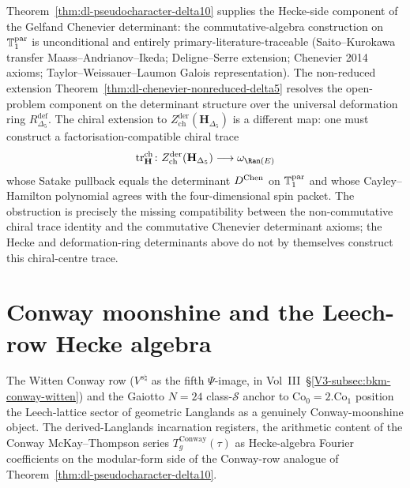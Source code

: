 \begin{remark}
\label{rem:dl-gelfand-pseudocharacter-obstruction}
Theorem~\ref{thm:dl-pseudocharacter-delta10} supplies the
Hecke-side component of the Gelfand Chenevier determinant: the
commutative-algebra construction on $\mathbb{T}^{\mathrm{par}}_1$ is unconditional and
entirely primary-literature-traceable (Saito--Kurokawa transfer
Maass--Andrianov--Ikeda; Deligne--Serre extension; Chenevier 2014
axioms; Taylor--Weissauer--Laumon Galois representation). The
non-reduced extension
Theorem~\ref{thm:dl-chenevier-nonreduced-delta5} resolves the
open-problem component on the determinant structure over the
universal deformation ring $R^{\mathrm{def}}_{\Delta_5}$. The chiral
extension to $Z^{\mathrm{der}}_{\mathrm{ch}}(\mathbf{H}_{\Delta_5})$
is a different map: one must construct a factorisation-compatible
chiral trace
\[
 \operatorname{tr}^{\mathrm{ch}}_{\mathbf H}\colon
 Z^{\mathrm{der}}_{\mathrm{ch}}(\mathbf{H}_{\Delta_5})
 \longrightarrow \omega_{\Ran(E)}
\]
whose Satake pullback equals the determinant \(D^{\mathrm{Chen}}\) on \(\mathbb{T}^{\mathrm{par}}_1\)
and whose Cayley--Hamilton polynomial agrees with the four-dimensional
spin packet. The obstruction is precisely the missing compatibility
between the non-commutative chiral trace identity and the commutative
Chenevier determinant axioms; the Hecke and deformation-ring
determinants above do not by themselves construct this chiral-centre
trace.
\end{remark}

\section{Conway moonshine and the Leech-row Hecke algebra}
\label{sec:dl-conway-moonshine-hecke}

The Witten Conway row ($V^{s\natural}$ as the fifth
$\Psi$-image, in
Vol~III~\S\ref{V3-subsec:bkm-conway-witten}) and the Gaiotto
$N = 24$ class-$\mathcal{S}$ anchor to $\mathrm{Co}_0 = 2.\mathrm{Co}_1$
position the Leech-lattice sector of geometric Langlands as a genuinely
Conway-moonshine object. The derived-Langlands incarnation registers, the arithmetic content of the Conway McKay--Thompson
series $T_g^{\mathrm{Conway}}(\tau)$ as Hecke-algebra Fourier
coefficients on the modular-form side of the Conway-row analogue of
Theorem~\ref{thm:dl-pseudocharacter-delta10}.

